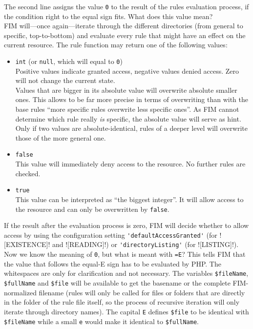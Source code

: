 \documentclass{scrartcl}
\begin{document}
      The second line assigns the value \lstinline!0! to the result of the rules evaluation process, if the condition right to the equal sign fits. What does this value mean? \\
      FIM will---once again---iterate through the different directories (from general to specific, top-to-bottom) and evaluate every rule that might have an effect on the current resource. The rule function may return one of the following values:
      \begin{itemize}
         \item \lstinline!int! (or \lstinline!null!, which will equal to \lstinline!0!) \\
            Positive values indicate granted access, negative values denied access. Zero will not change the current state. \\
            Values that are bigger in its absolute value will overwrite absolute smaller ones. This allows to be far more precise in terms of overwriting than with the base rules ``more specific rules overwrite less specific ones''. As FIM cannot determine which rule really \emph{is} specific, the absolute value will serve as hint. Only if two values are absolute-identical, rules of a deeper level will overwrite those of the more general one.
         \item \lstinline!false! \\
            This value will immediately deny access to the resource. No further rules are checked.
         \item \lstinline!true! \\
            This value can be interpreted as ``the biggest integer''. It will allow access to the resource and can only be overwritten by \lstinline!false!.
      \end{itemize}
      If the result after the evaluation process is zero, FIM will decide whether to allow access by using the configuration setting \lstinline!'defaultAccessGranted'! (for \fimrule![EXISTENCE]! and \fimrule![READING]!) or \lstinline!'directoryListing'! (for \fimrule![LISTING]!). \\
      Now we know the meaning of \lstinline!0!, but what is meant with \texttt{=E}? This tells FIM that the value that follows the equal-E sign has to be evaluated by PHP. The whitespaces are only for clarification and not necessary. The variables \lstinline!$fileName!, \lstinline!$fullName! and \lstinline!$file! will be available to get the basename or the complete FIM-normalized filename (rules will only be called for files or folders that are directly in the folder of the rule file itself, so the process of recursive iteration will only iterate through directory names). The capital \texttt{E} defines \lstinline!$file! to be identical with \lstinline!$fileName! while a small \texttt{e} would make it identical to \lstinline!$fullName!. \\
\end{document}
